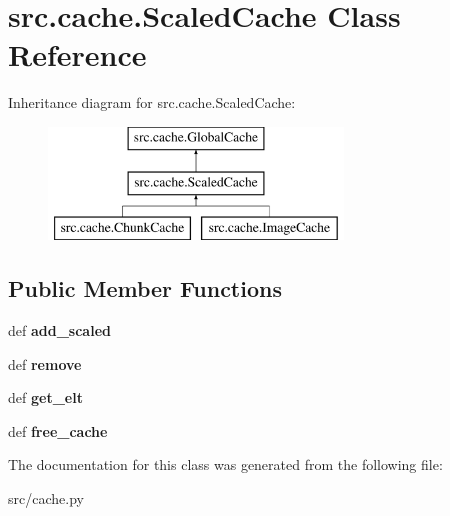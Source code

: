 \hypertarget{classsrc_1_1cache_1_1_scaled_cache}{\section{src.\-cache.\-Scaled\-Cache \-Class \-Reference}
\label{classsrc_1_1cache_1_1_scaled_cache}
}
\-Inheritance diagram for src.\-cache.\-Scaled\-Cache\-:\begin{figure}[H]
\begin{center}
\leavevmode
\includegraphics[height=3.000000cm]{classsrc_1_1cache_1_1_scaled_cache}
\end{center}
\end{figure}
\subsection*{\-Public \-Member \-Functions}
\begin{DoxyCompactItemize}
\item 
\hypertarget{classsrc_1_1cache_1_1_scaled_cache_ab5f3c86d112521b604d2550cffe91a12}{def {\bfseries add\-\_\-scaled}}\label{classsrc_1_1cache_1_1_scaled_cache_ab5f3c86d112521b604d2550cffe91a12}

\item 
\hypertarget{classsrc_1_1cache_1_1_scaled_cache_a93151f8e5cc63929e645090f7722cf75}{def {\bfseries remove}}\label{classsrc_1_1cache_1_1_scaled_cache_a93151f8e5cc63929e645090f7722cf75}

\item 
\hypertarget{classsrc_1_1cache_1_1_scaled_cache_aab73cd22bce9c3036221d2b3ae403aa6}{def {\bfseries get\-\_\-elt}}\label{classsrc_1_1cache_1_1_scaled_cache_aab73cd22bce9c3036221d2b3ae403aa6}

\item 
\hypertarget{classsrc_1_1cache_1_1_scaled_cache_a5a18613fcfe33f82cf1e592461100305}{def {\bfseries free\-\_\-cache}}\label{classsrc_1_1cache_1_1_scaled_cache_a5a18613fcfe33f82cf1e592461100305}

\end{DoxyCompactItemize}


\-The documentation for this class was generated from the following file\-:\begin{DoxyCompactItemize}
\item 
src/cache.\-py\end{DoxyCompactItemize}
